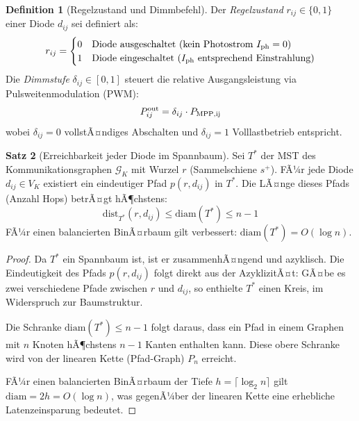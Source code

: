 ﻿\documentclass[a4paper,12pt]{article}
\theoremstyle{definition}
\newtheorem{definition}{Definition}[section]
\newtheorem{satz}[definition]{Satz}
\theoremstyle{remark}
\begin{document}
\begin{definition}[Regelzustand und Dimmbefehl]
\label{def:regelzustand}
Der \emph{Regelzustand} $r_{ij} \in \{0,1\}$ einer Diode $d_{ij}$ sei definiert als:
\begin{equation}
  r_{ij} = \begin{cases}
    0 & \text{Diode ausgeschaltet (kein Photostrom $I_{\rm ph} = 0$)} \\
    1 & \text{Diode eingeschaltet ($I_{\rm ph}$ entsprechend Einstrahlung)}
  \end{cases}
  \label{eq:regelzustand}
\end{equation}
Die \emph{Dimmstufe} $\delta_{ij} \in [0,1]$ steuert die relative Ausgangsleistung
via Pulsweitenmodulation (PWM):
\begin{equation}
  P_{ij}^{\rm out} = \delta_{ij} \cdot P_{\rm MPP,ij}
  \label{eq:dimmformel}
\end{equation}
wobei $\delta_{ij} = 0$ vollstÃ¤ndiges Abschalten und $\delta_{ij} = 1$
Volllastbetrieb entspricht.
\end{definition}

\begin{satz}[Erreichbarkeit jeder Diode im Spannbaum]
\label{satz:erreichbarkeit}
Sei $T^*$ der MST des Kommunikationsgraphen $\mathcal{G}_K$ mit Wurzel $r$
(Sammelschiene $s^+$). FÃ¼r jede Diode $d_{ij} \in V_K$ existiert ein
eindeutiger Pfad $p(r, d_{ij})$ in $T^*$. Die LÃ¤nge dieses Pfads
(Anzahl Hops) betrÃ¤gt hÃ¶chstens:
\begin{equation}
  \mathrm{dist}_{T^*}(r, d_{ij}) \leq \mathrm{diam}(T^*) \leq n - 1
  \label{eq:erreichbarkeit}
\end{equation}
FÃ¼r einen balancierten BinÃ¤rbaum gilt verbessert:
$\mathrm{diam}(T^*) = O(\log n)$.
\end{satz}

\begin{proof}
Da $T^*$ ein Spannbaum ist, ist er zusammenhÃ¤ngend und azyklisch.
Die Eindeutigkeit des Pfads $p(r, d_{ij})$ folgt direkt aus der
AzyklizitÃ¤t: GÃ¤be es zwei verschiedene Pfade zwischen $r$ und $d_{ij}$,
so enthielte $T^*$ einen Kreis, im Widerspruch zur Baumstruktur.

Die Schranke $\mathrm{diam}(T^*) \leq n - 1$ folgt daraus, dass ein Pfad
in einem Graphen mit $n$ Knoten hÃ¶chstens $n-1$ Kanten enthalten kann.
Diese obere Schranke wird von der linearen Kette (Pfad-Graph) $P_n$ erreicht.

FÃ¼r einen balancierten BinÃ¤rbaum der Tiefe $h = \lceil \log_2 n \rceil$ gilt
$\mathrm{diam} = 2h = O(\log n)$, was gegenÃ¼ber der linearen Kette eine
erhebliche Latenzeinsparung bedeutet.
\end{proof}
\end{document}
